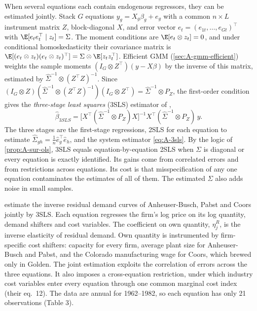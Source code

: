 When several equations each contain endogenous regressors, they can be estimated jointly. Stack $G$ equations
$y_g = X_g\beta_g + e_g$ with a common $n \times L$ instrument matrix $Z$, block-diagonal $X$, and error vector
$e_t = (e_{1t}, \dots, e_{Gt})^\top$ with $\E[e_te_t^\top \mid z_t] = \Sigma$. The moment conditions are
$\E[e_t \otimes z_t] = 0$, and under conditional homoskedasticity their covariance matrix is
$\E[(e_t \otimes z_t)(e_t \otimes z_t)^\top] = \Sigma \otimes \E[z_tz_t^\top]$. Efficient GMM (\cref{sec:A-gmm-efficient}) weights the
sample moments $(I_G \otimes Z^\top)(y - X\beta)$ by the inverse of this matrix, estimated by
$\hat\Sigma^{-1} \otimes (Z^\top Z)^{-1}$. Since
$(I_G \otimes Z)(\hat\Sigma^{-1} \otimes (Z^\top Z)^{-1})(I_G \otimes Z^\top) = \hat\Sigma^{-1} \otimes P_Z$, the first-order
condition gives the \emph{three-stage least squares} (3SLS) estimator of \citet{ZellnerTheil1962},
\begin{equation}\label{eq:A-3sls}
\hat\beta_{3SLS} = \bigl[X^\top(\hat\Sigma^{-1} \otimes P_Z)X\bigr]^{-1}X^\top(\hat\Sigma^{-1} \otimes P_Z)\,y .
\end{equation}
The three stages are the first-stage regressions, 2SLS for each equation to estimate
$\hat\Sigma_{gh} = \frac{1}{n}\hat e_g^\top\hat e_h$, and the system estimator \eqref{eq:A-3sls}. By the logic of
\cref{prop:A-sur-ols}, 3SLS equals equation-by-equation 2SLS when $\Sigma$ is diagonal or every equation is
exactly identified. Its gains come from correlated errors and from restrictions across equations. Its cost is
that misspecification of any one equation contaminates the estimates of all of them. The estimated $\Sigma$
also adds noise in small samples.

\citet{BakerBresnahan1988} estimate the inverse residual demand curves of Anheuser-Busch, Pabst and Coors
jointly by 3SLS. Each equation regresses the firm's log price on its log quantity, demand shifters and cost
variables. The coefficient on own quantity, $\eta^R_j$, is the inverse elasticity of residual demand. Own
quantity is instrumented by firm-specific cost shifters: capacity for every firm, average plant size for
Anheuser-Busch and Pabst, and the Colorado manufacturing wage for Coors, which brewed only in Golden. The joint
estimation exploits the correlation of errors across the three equations. It also imposes a cross-equation
restriction, under which industry cost variables enter every equation through one common marginal cost index
(their eq.~12). The data are annual for 1962--1982, so each equation has only 21 observations (Table 3).

